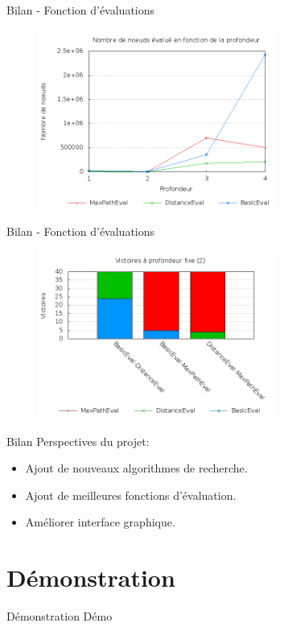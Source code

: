 \documentclass{beamer}
\begin{document}
	\begin{frame}{Bilan - Fonction d'évaluations}
		\begin{figure}[h!]
			\centering
			\includegraphics[width=0.7\textwidth]{images/nbNodeDepth.png}
		\end{figure}
	\end{frame}

	\begin{frame}{Bilan - Fonction d'évaluations}
		\begin{figure}[h!]
			\centering
			\includegraphics[width=0.7\textwidth]{images/victoireProfFixe.jpg}
		\end{figure}
	\end{frame}

	\begin{frame}{Bilan}
		Perspectives du projet:

		\vspace{1em}
		\begin{itemize}
			\item Ajout de nouveaux algorithmes de recherche.
			\vspace{0.75em}
			\item Ajout de meilleures fonctions d'évaluation.
			\vspace{0.75em}
			\item Améliorer interface graphique.
		\end{itemize}
	\end{frame}

	\section{Démonstration}

	\begin{frame}{Démonstration}
		Démo
	\end{frame}
\end{document}
